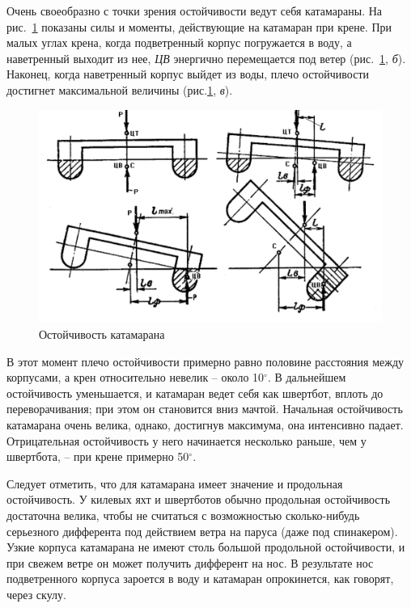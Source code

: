 \documentclass[a4paper, 12pt, twoside, final]{scrbook}
\begin{document}
Очень своеобразно с точки зрения остойчивости ведут себя катамараны. На рис.~\ref{fig:81} показаны силы и моменты, действующие на катамаран при крене. При малых углах крена, когда подветренный корпус погружается в воду, а наветренный выходит из нее, \textit{ЦВ} энергично перемещается под ветер (рис.~\ref{fig:81}, \textit{б}). Наконец, когда наветренный корпус выйдет из воды, плечо остойчивости достигнет максимальной величины (рис.\ref{fig:81}, \textit{в}).

\begin{figure}[htbp]
   \centering
   \includegraphics{pics/81_Ostojchevost_katamarana} %
   \caption{Остойчивость катамарана}
   \label{fig:81}
\end{figure}

В этот момент плечо остойчивости примерно равно половине расстояния между корпусами, а крен относительно невелик \--- около 10$^\circ$. В дальнейшем остойчивость уменьшается, и катамаран ведет себя как швертбот, вплоть до переворачивания; при этом он становится вниз мачтой. Начальная остойчивость катамарана очень велика, однако, достигнув максимума, она интенсивно падает. Отрицательная остойчивость у него начинается несколько раньше, чем у швертбота, \--- при крене примерно 50$^\circ$.

Следует отметить, что для катамарана имеет значение и продольная остойчивость. У килевых яхт и швертботов обычно продольная остойчивость достаточна велика, чтобы не считаться с возможностью сколько-нибудь серьезного дифферента под действием ветра на паруса (даже под спинакером). Узкие корпуса катамарана не имеют столь большой продольной остойчивости, и при свежем ветре он может получить дифферент на нос. В результате нос подветренного корпуса зароется в воду и катамаран опрокинется, как говорят, через скулу.
\end{document}
